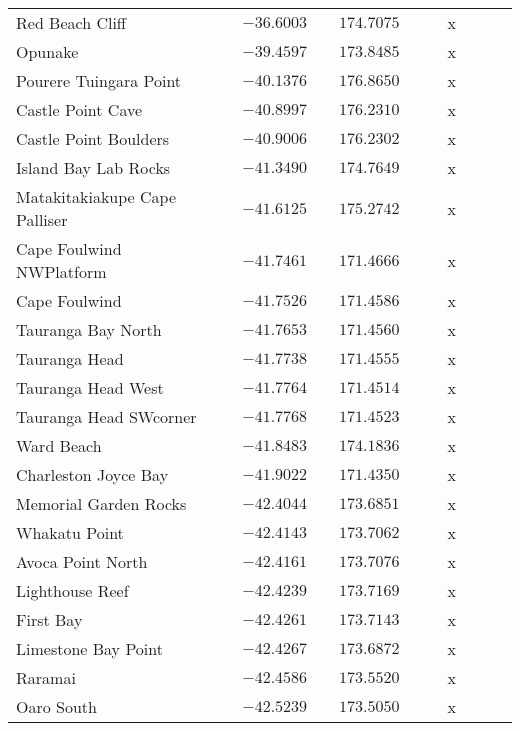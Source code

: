\begin{table}[!htbp]
\begin{center}
\begin{tabular}{lcrcrcllcll}
Red Beach Cliff&&$-36.6003$&&$174.7075$&&&x&&&\tabularnewline
Opunake&&$-39.4597$&&$173.8485$&&&x&&&\tabularnewline
Pourere Tuingara Point&&$-40.1376$&&$176.8650$&&&x&&&\tabularnewline
Castle Point Cave&&$-40.8997$&&$176.2310$&&&x&&&\tabularnewline
Castle Point Boulders&&$-40.9006$&&$176.2302$&&&x&&&\tabularnewline
Island Bay Lab Rocks&&$-41.3490$&&$174.7649$&&&x&&&\tabularnewline
Matakitakiakupe Cape Palliser&&$-41.6125$&&$175.2742$&&&x&&&\tabularnewline
Cape Foulwind NWPlatform&&$-41.7461$&&$171.4666$&&&x&&&\tabularnewline
Cape Foulwind&&$-41.7526$&&$171.4586$&&&x&&&\tabularnewline
Tauranga Bay North&&$-41.7653$&&$171.4560$&&&x&&&\tabularnewline
Tauranga Head&&$-41.7738$&&$171.4555$&&&x&&&\tabularnewline
Tauranga Head West&&$-41.7764$&&$171.4514$&&&x&&&\tabularnewline
Tauranga Head SWcorner&&$-41.7768$&&$171.4523$&&&x&&&\tabularnewline
Ward Beach&&$-41.8483$&&$174.1836$&&&x&&&\tabularnewline
Charleston Joyce Bay&&$-41.9022$&&$171.4350$&&&x&&&\tabularnewline
Memorial Garden Rocks&&$-42.4044$&&$173.6851$&&&x&&&\tabularnewline
Whakatu Point&&$-42.4143$&&$173.7062$&&&x&&&\tabularnewline
Avoca Point North&&$-42.4161$&&$173.7076$&&&x&&&\tabularnewline
Lighthouse Reef&&$-42.4239$&&$173.7169$&&&x&&&\tabularnewline
First Bay&&$-42.4261$&&$173.7143$&&&x&&&\tabularnewline
Limestone Bay Point&&$-42.4267$&&$173.6872$&&&x&&&\tabularnewline
Raramai&&$-42.4586$&&$173.5520$&&&x&&&\tabularnewline
Oaro South&&$-42.5239$&&$173.5050$&&&x&&&\tabularnewline
\hline
\end{tabular}\end{center}
\end{table}
